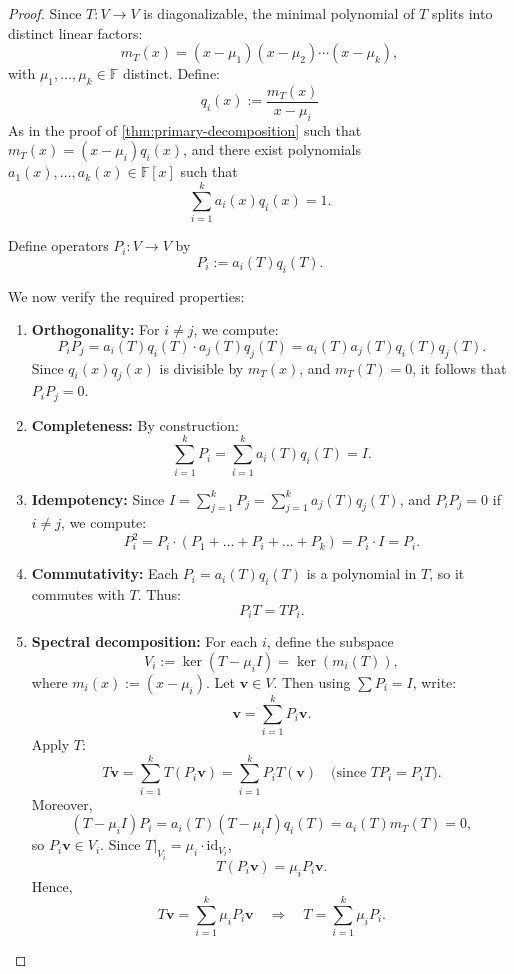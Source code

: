 \begin{proof}
Since \(T : V \to V\) is diagonalizable, the minimal polynomial of \(T\) splits into distinct linear factors:
\[
m_T(x) = (x - \mu_1)(x - \mu_2) \cdots (x - \mu_k),
\]
with \(\mu_1, \ldots, \mu_k \in \mathbb{F}\) distinct. Define:
\[
q_i(x) := \frac{m_T(x)}{x-\mu_i}
\]
As in the proof of \autoref{thm:primary-decomposition} such that $m_T(x) = (x - \mu_i) q_i(x)$, and there exist polynomials \(a_1(x), \ldots, a_k(x) \in \mathbb{F}[x]\) such that
\[
\sum_{i=1}^k a_i(x) q_i(x) = 1.
\]

Define operators \(P_i : V \to V\) by
\[
P_i := a_i(T) q_i(T).
\]

We now verify the required properties:
\begin{enumerate}
    \item[\textbf{(1)}] \textbf{Orthogonality:}  
    For \(i \ne j\), we compute:
    \[
    P_i P_j = a_i(T) q_i(T) \cdot a_j(T) q_j(T) = a_i(T) a_j(T) q_i(T) q_j(T).
    \]
    Since \(q_i(x) q_j(x)\) is divisible by \(m_T(x)\), and \(m_T(T) = 0\), it follows that $P_i P_j = 0$.

    \item[\textbf{(2)}] \textbf{Completeness:}  
    By construction:
    \[
    \sum_{i=1}^k P_i = \sum_{i=1}^k a_i(T) q_i(T) = I.
    \]
    \item[\textbf{(3)}] \textbf{Idempotency:} Since \(I = \sum_{j=1}^k P_j = \sum_{j=1}^k a_j(T) q_j(T)\), and $P_iP_j = 0$ if $i \neq j$, we compute:
    \[
    P_i^2 = P_i \cdot (P_1 + \dots +P_i + \dots +P_k) = P_i \cdot I = P_i.
    \]
    \item[\textbf{(4)}] \textbf{Commutativity:}  
    Each \(P_i = a_i(T) q_i(T)\) is a polynomial in \(T\), so it commutes with \(T\). Thus:
    \[
    P_i T = T P_i.
    \]

    \item[\textbf{(5)}] \textbf{Spectral decomposition:}  
    For each \(i\), define the subspace
    \[
    V_i := \ker(T - \mu_i I) = \ker( m_i(T)),
    \]
    where \(m_i(x) := (x - \mu_i)\). Let \(\mathbf{v} \in V\). Then using \(\sum P_i = I\), write:
    \[
    \mathbf{v} = \sum_{i=1}^k P_i \mathbf{v}.
    \]
    Apply \(T\):
    \[
    T \mathbf{v} = \sum_{i=1}^k T(P_i \mathbf{v}) = \sum_{i=1}^k P_i T(\mathbf{v}) \quad \text{(since } T P_i = P_i T\text{)}.
    \]
    Moreover,
    \[
    (T-\mu_i I)P_i
    =a_i(T)(T-\mu_i I)q_i(T)
    =a_i(T)m_T(T)=0,
    \]
    so \(P_i \mathbf{v} \in V_i\). Since \(T|_{V_i} = \mu_i \cdot \mathrm{id}_{V_i}\),
    \[
    T(P_i \mathbf{v}) = \mu_i P_i \mathbf{v}.
    \]
    Hence,
    \[
    T \mathbf{v} = \sum_{i=1}^k \mu_i P_i \mathbf{v} \quad \Rightarrow \quad T = \sum_{i=1}^k \mu_i P_i.
    \]
\end{enumerate}
\end{proof}

